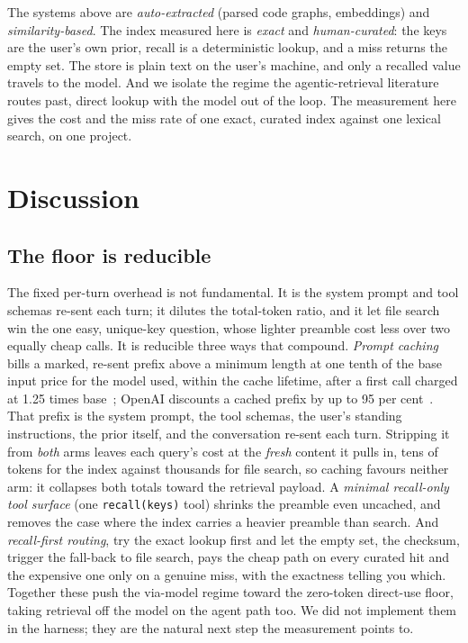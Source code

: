 \documentclass[11pt]{article}
\newcommand{\code}[1]{\texttt{#1}}
\begin{document}
The systems above are \emph{auto-extracted} (parsed code graphs, embeddings) and
\emph{similarity-based}. The index measured here is \emph{exact} and
\emph{human-curated}: the keys are the user's own prior, recall is a deterministic
lookup, and a miss returns the empty set. The store is plain text on the user's
machine, and only a recalled value travels to the model. And we isolate the regime
the agentic-retrieval literature routes past, direct lookup with the model out of the
loop. The measurement here gives the cost and the miss rate of one exact,
curated index against one lexical search, on one project.

\section{Discussion}

\subsection*{The floor is reducible}

The fixed per-turn overhead is not fundamental. It is the system prompt and tool
schemas re-sent each turn; it dilutes the total-token ratio, and it let file search
win the one easy, unique-key question, whose lighter preamble cost less over two
equally cheap calls. It is reducible three ways that compound. \emph{Prompt caching} bills a marked, re-sent prefix above a minimum length at
one tenth of the base input price for the model used, within the cache lifetime,
after a first call charged at 1.25 times base~\cite{caching,pricing}; OpenAI
discounts a cached prefix by up to 95 per cent~\cite{openaicaching}. That prefix is the system prompt,
the tool schemas, the user's standing instructions, the prior itself, and the
conversation re-sent each turn. Stripping it from \emph{both} arms leaves each
query's cost at the \emph{fresh} content it pulls in, tens of tokens for the index
against thousands for file search, so caching favours neither arm: it collapses
both totals toward the retrieval payload. A
\emph{minimal recall-only tool surface} (one \code{recall(keys)} tool) shrinks the
preamble even uncached, and removes the case where the index carries a heavier
preamble than search. And \emph{recall-first routing}, try the exact lookup first
and let the empty set, the checksum, trigger the fall-back to file search, pays the
cheap path on every curated hit and the expensive one only on a genuine miss, with
the exactness telling you which. Together these push the via-model regime toward the
zero-token direct-use floor, taking retrieval off the model on the agent path too.
We did not implement them in the harness; they are the natural next step the
measurement points to.
\end{document}
